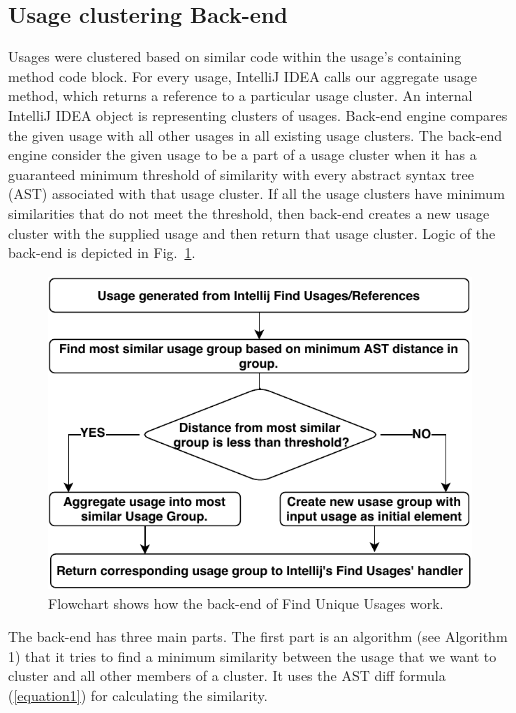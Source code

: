 \documentclass[conference]{IEEEtran}
\begin{document}
\subsection{Usage clustering Back-end} 
Usages were clustered based on similar code within the usage's containing method code block. For every usage, IntelliJ IDEA calls our aggregate usage method, which returns a reference to a particular usage cluster. An internal IntelliJ IDEA object is representing clusters of usages. Back-end engine compares the given usage with all other usages in all existing usage clusters. The back-end engine consider the given usage to be a part of a usage cluster when it has a guaranteed minimum threshold of similarity with every abstract syntax tree (AST)  associated with that usage cluster. If all the usage clusters have minimum similarities that do not meet the threshold, then back-end creates a new usage cluster with the supplied usage and then return that usage cluster. Logic of the back-end is depicted in Fig.~\ref{fig:flowchart}. \par
\begin{figure}
    \centering
    \includegraphics [width=\columnwidth,keepaspectratio, clip]{figures/flowchart}
    \caption{Flowchart shows how the back-end of Find Unique Usages work. }
\label{fig:flowchart}
\end{figure}

The back-end has three main parts. The first part is an algorithm (see Algorithm 1) that it tries to find a minimum similarity between the usage that we want to cluster and all other members of a cluster. It uses the AST diff formula (\ref{equation1}) for calculating the similarity.\par
\end{document}
